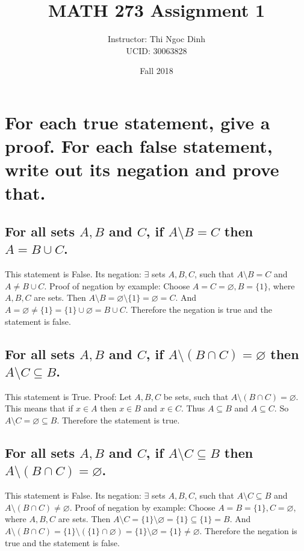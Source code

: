 \documentclass[10pt, letterpaper, titlepage]{article}
\title{MATH 273 Assignment 1}
\author{Instructor: Thi Ngoc Dinh
    \\UCID: 30063828}
\date{Fall 2018}
\newcommand{\0}{\varnothing}
\newcommand{\1}{\{ 1 \}}
\newcommand{\2}{\{ (1,1) \}}
\begin{document}
    \maketitle

    \section{For each true statement, give a proof. For each false statement, write out its negation and prove that.}
        \subsection{For all sets $A, B$ and $C$, if $A \setminus B = C$ then $A = B \cup C$.}
            This statement is False.
            Its negation: $\exists$ sets $A, B,C$, such that $A \setminus B = C$ and $A \neq B \cup C$.
            Proof of negation by example:
            Choose $A = C = \0, B = \1$, where $A, B, C$ are sets.
            Then $A \setminus B = \0 \setminus \1 = \0 = C$.
            And $A = \0 \neq \1 = \1 \cup \0 = B \cup C$.
            Therefore the negation is true and the statement is false.

        \subsection{For all sets $A, B$ and $C$, if $A \setminus (B \cap C) = \0$ then $A \setminus C \subseteq B$.}
            This statement is True.
            Proof:
            Let $A, B, C$ be sets, such that $A \setminus (B \cap C) = \0$.
            This means that if $x \in A$ then $x \in B$ and $x \in C$.
            Thus $A \subseteq B$ and $A \subseteq C$.
            So $A \setminus C = \0 \subseteq B$.
            Therefore the statement is true.

        \subsection{For all sets $A, B$ and $C$, if $A \setminus C \subseteq B$ then $A \setminus (B \cap C) = \0$.}
            This statement is False.
            Its negation: $\exists$ sets $A, B, C$, such that $A \setminus C \subseteq B$ and $A \setminus (B \cap C) \neq \0$.
            Proof of negation by example:
            Choose $A = B = \1, C = \0$, where $A, B, C$ are sets.
            Then $A \setminus C = \1 \setminus \0 = \1 \subseteq \1 = B$.
            And $A \setminus (B \cap C) = \1 \setminus (\1 \cap \0) = \1 \setminus \0 = \1 \neq \0$.
            Therefore the negation is true and the statement is false.
\end{document}
